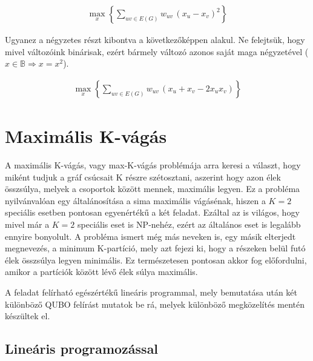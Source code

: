 \begin{align}
	\max_{x} \left\{ \sum_{uv \in E(G)}{w_{uv} \, (x_u-x_v)^2}\right\}
\end{align}

Ugyanez a négyzetes részt kibontva a következőképpen alakul. Ne felejtsük, hogy mivel változóink binárisak, ezért bármely változó azonos saját maga négyzetével ($x \in \mathbb{B} \Rightarrow x = x^2$).

\begin{align}
	\max_{x} \left\{ \sum_{uv \in E(G)}{w_{uv} \, (x_u + x_v -2 x_u x_v)}\right\}
\end{align}


\section{Maximális K-vágás}\label{sec:theoryMaxKCut}

A maximális K-vágás, vagy max-K-vágás problémája arra keresi a választ, hogy miként tudjuk a gráf csúcsait K részre szétosztani, aszerint hogy azon élek összsúlya, melyek a csoportok között mennek, maximális legyen. Ez a probléma nyilvánvalóan egy általánosítása a sima maximális vágásénak, hiszen a $K=2$ speciális esetben pontosan egyenértékű a két feladat. Ezáltal az is világos, hogy mivel már a $K=2$ speciális eset is NP-nehéz, ezért az általános eset is legalább ennyire bonyolult.
A probléma ismert még más neveken is, egy másik elterjedt megnevezés, a minimum K-partíció, mely azt fejezi ki, hogy a részeken belül futó élek összsúlya legyen minimális. Ez természetesen pontosan akkor fog előfordulni, amikor a partíciók között lévő élek súlya maximális.

A feladat felírható egészértékű lineáris programmal, mely bemutatása után két különböző QUBO felírást mutatok be rá, melyek különböző megközelítés mentén készültek el.

\subsection{Lineáris programozással}\label{sec:theoryMaxKCutLP}

